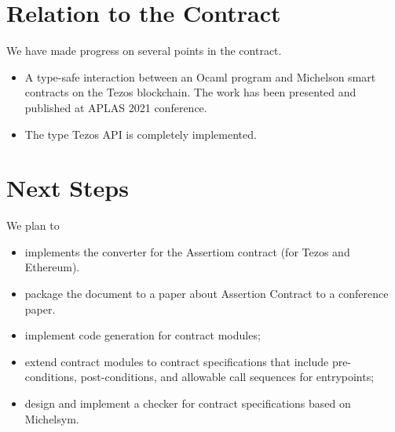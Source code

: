 \documentclass[a4paper,11pt]{article}
\begin{document}
\section{Relation to the Contract}
\label{sec:relation-contract}

We have made progress on several points in the contract.
\begin{itemize}
\item A type-safe interaction between an Ocaml program and Michelson smart contracts on the Tezos blockchain. The work has been presented and published at APLAS 2021 conference. 
\item The type Tezos API is completely implemented.

\end{itemize}


\section{Next Steps}

We plan to 
\begin{itemize}
\item implements the converter for the Assertiom contract (for Tezos and Ethereum). 
\item package the document to a paper about Assertion Contract to a conference paper.
\item implement code generation for contract modules; 
\item extend contract modules to contract specifications that include pre-conditions, post-conditions, and allowable call sequences for entrypoints; 
\item design and implement a checker for contract specifications based on Michelsym.
\end{itemize}





\end{document}
